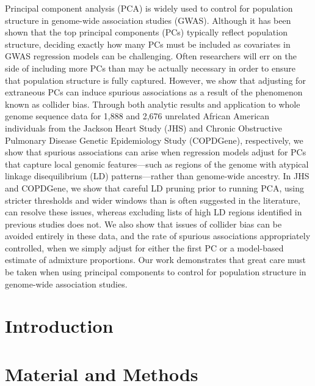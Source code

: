 \documentclass[12pt]{article}
\begin{document}
Principal component analysis (PCA) is widely used to control for population structure in genome-wide association studies (GWAS). Although it has been shown that the top principal components (PCs) typically reflect population structure, deciding exactly how many PCs must be included as covariates in GWAS regression models can be challenging. Often researchers will err on the side of including more PCs than may be actually necessary in order to ensure that population structure is fully captured. However, we show that adjusting for extraneous PCs can induce spurious associations as a result of the phenomenon known as collider bias. Through both analytic results and application to whole genome sequence data for 1,888 and 2,676 unrelated African American individuals from the Jackson Heart Study (JHS) and Chronic Obstructive Pulmonary Disease Genetic Epidemiology Study (COPDGene), respectively, we show that spurious associations can arise when regression models adjust for PCs that capture local genomic features—such as regions of the genome with atypical linkage disequilibrium (LD) patterns—rather than genome-wide ancestry. In JHS and COPDGene, we show that careful LD pruning prior to running PCA, using stricter thresholds and wider windows than is often suggested in the literature, can resolve these issues, whereas excluding lists of high LD regions identified in previous studies does not. We also show that issues of collider bias can be avoided entirely in these data, and the rate of spurious associations appropriately controlled, when we simply adjust for either the first PC or a model-based estimate of admixture proportions. Our work demonstrates that great care must be taken when using principal components to control for population structure in genome-wide association studies. 

\section{Introduction}


\section{Material and Methods}

\end{document}
